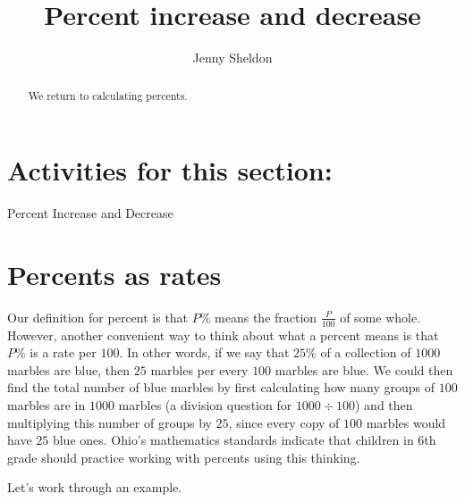 \documentclass{ximera}
\title{Percent increase and decrease}
\author{Jenny Sheldon}
\begin{document}
\begin{abstract}
We return to calculating percents.
\end{abstract}
\maketitle

\section{Activities for this section:} Percent Increase and Decrease

\section{Percents as rates}

Our definition for percent is that $P\%$ means the fraction $\frac{P}{100}$ of some whole. However, another convenient way to think about what a percent means is that $P\%$ is a rate per $100$. In other words, if we say that $25\%$ of a collection of $1000$ marbles are blue, then $25$ marbles per every $100$ marbles are blue. We could then find the total number of blue marbles by first calculating how many groups of $100$ marbles are in $1000$ marbles (a division question for $1000 \div 100$) and then multiplying this number of groups by $25$, since every copy of $100$ marbles would have $25$ blue ones. Ohio's mathematics standards indicate that children in 6th grade should practice working with percents using this thinking.

Let's work through an example.
\end{document}
